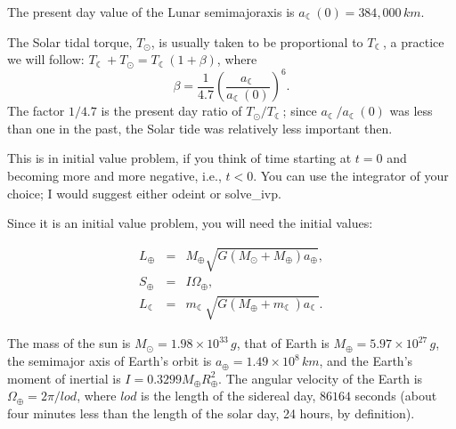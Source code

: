 \documentclass[12pt]{article}
\begin{document}
The present day value of the Lunar semimajoraxis is $a_{\leftmoon}(0)=384,000\, km$.

The Solar tidal torque, $T_\odot$, is usually taken to be proportional to $T_{\leftmoon}$, a practice we will follow: $T_{\leftmoon}+T_\odot=T_{\leftmoon}(1+\beta)$, where
\begin{equation}
  \beta = \frac{1}{4.7}  \left(\frac{a_{\leftmoon}}{a_{\leftmoon}(0)}\right)^6.
\end{equation}
The factor $1/4.7$ is the present day ratio of $T_\odot/T_{\leftmoon}$; since $a_{\leftmoon}/a_{\leftmoon}(0)$ was less than one in the past, the Solar tide was relatively less important then.

This is in initial value problem, if you think of time starting at $t=0$ and becoming more and more negative, i.e., $t<0$. You can use the integrator of your choice; I would suggest either odeint or solve\_ivp.

Since it is an initial value problem, you will need the initial values:

\begin{eqnarray}
L_\oplus &=& M_\oplus\sqrt{G(M_\odot + M_\oplus) a_\oplus},\\
S_\oplus &=& I\Omega_\oplus,\\
L_{\leftmoon} &=& m_{\leftmoon}\sqrt{G(M_\oplus+m_{\leftmoon}) a_{\leftmoon}}.
\end{eqnarray}

The mass of the sun is $M_\odot=1.98\times10^{33}\, g$, that of Earth is $M_\oplus=5.97\times10^{27}\, g$, the semimajor axis of Earth's orbit is $a_\oplus=1.49\times10^8\, km$, and the Earth's moment of inertial is $I=0.3299M_\oplus R_\oplus^2$. The angular velocity of the Earth is $\Omega_\oplus=2\pi/lod$, where $lod$ is the length of the sidereal day, $86164$ seconds (about four minutes less than the length of the solar day, 24 hours, by definition).
\end{document}
